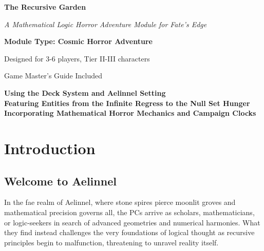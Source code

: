 \documentclass[11pt]{article}
\begin{document}
\begin{titlepage}
\centering
\vspace*{2cm}

{\Huge\bfseries\color{headercolor} The Recursive Garden} 

\vspace{0.5cm}

{\Large\itshape A Mathematical Logic Horror Adventure Module for Fate's Edge}

\vspace{2cm}

\vspace{2cm}

{\Large\bfseries Module Type: Cosmic Horror Adventure}

\vspace{1cm}

{\large Designed for 3-6 players, Tier II-III characters}

\vspace{1cm}

{\large Game Master's Guide Included}

\vfill

{\large 
\textbf{Using the Deck System and Aelinnel Setting} \\
\textbf{Featuring Entities from the Infinite Regress to the Null Set Hunger} \\
\textbf{Incorporating Mathematical Horror Mechanics and Campaign Clocks}
}

\end{titlepage}

\newpage

\tableofcontents

\newpage

\section{Introduction}

\subsection{Welcome to Aelinnel}

In the fae realm of Aelinnel, where stone spires pierce moonlit groves and mathematical precision governs all, the PCs arrive as scholars, mathematicians, or logic-seekers in search of advanced geometries and numerical harmonies. What they find instead challenges the very foundations of logical thought as recursive principles begin to malfunction, threatening to unravel reality itself.
\end{document}
